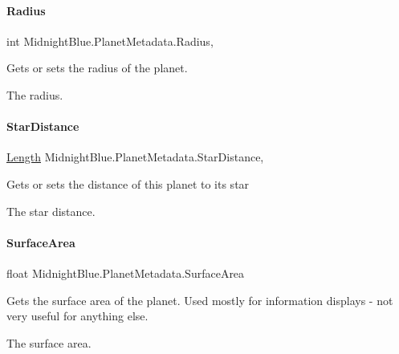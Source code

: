\paragraph{\texorpdfstring{Radius}{Radius}}
{\footnotesize\ttfamily int Midnight\+Blue.\+Planet\+Metadata.\+Radius\hspace{0.3cm}{\ttfamily [get]}, {\ttfamily [set]}}



Gets or sets the radius of the planet. 

The radius.\hypertarget{class_midnight_blue_1_1_planet_metadata_a64e2d5e667ebf1d04a031ded2f68a718}{}\label{class_midnight_blue_1_1_planet_metadata_a64e2d5e667ebf1d04a031ded2f68a718} 
\paragraph{\texorpdfstring{Star\+Distance}{StarDistance}}
{\footnotesize\ttfamily \hyperlink{class_midnight_blue_1_1_length}{Length} Midnight\+Blue.\+Planet\+Metadata.\+Star\+Distance\hspace{0.3cm}{\ttfamily [get]}, {\ttfamily [set]}}



Gets or sets the distance of this planet to its star 

The star distance.\hypertarget{class_midnight_blue_1_1_planet_metadata_a3fde09dbb0d471d2d50020f73089b475}{}\label{class_midnight_blue_1_1_planet_metadata_a3fde09dbb0d471d2d50020f73089b475} 
\paragraph{\texorpdfstring{Surface\+Area}{SurfaceArea}}
{\footnotesize\ttfamily float Midnight\+Blue.\+Planet\+Metadata.\+Surface\+Area\hspace{0.3cm}{\ttfamily [get]}}



Gets the surface area of the planet. Used mostly for information displays -\/ not very useful for anything else. 

The surface area.\hypertarget{class_midnight_blue_1_1_planet_metadata_a6902b9cd6ac9400696c6aaa74a52821f}{}\label{class_midnight_blue_1_1_planet_metadata_a6902b9cd6ac9400696c6aaa74a52821f} 
